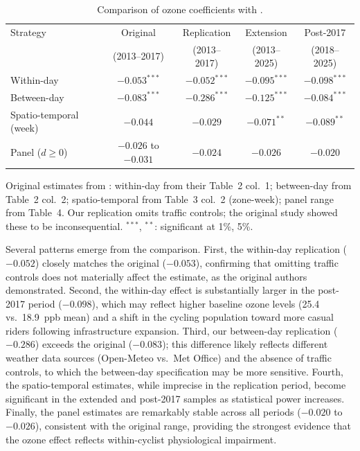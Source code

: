 \documentclass[12pt]{article}
\begin{document}
\begin{table}[H]
\centering
\caption{Comparison of ozone coefficients with \citet{klingen2020urban}.}
\label{tab:comparison}
\begin{tabular}{lcccc}
\toprule
Strategy & Original & Replication & Extension & Post-2017 \\
         & (2013--2017) & (2013--2017) & (2013--2025) & (2018--2025) \\
\midrule
Within-day        & $-0.053^{***}$ & $-0.052^{***}$ & $-0.095^{***}$ & $-0.098^{***}$ \\
Between-day       & $-0.083^{***}$ & $-0.286^{***}$ & $-0.125^{***}$ & $-0.084^{***}$ \\
Spatio-temporal (week) & $-0.044$  & $-0.029$       & $-0.071^{**}$  & $-0.089^{**}$  \\
Panel ($d \geq 0$) & $-0.026$ to $-0.031$ & $-0.024$ & $-0.026$ & $-0.020$ \\
\bottomrule
\end{tabular}

\medskip
\footnotesize Original estimates from \citet{klingen2020urban}: within-day from their Table~2 col.~1; between-day from Table~2 col.~2; spatio-temporal from Table~3 col.~2 (zone-week); panel range from Table~4. Our replication omits traffic controls; the original study showed these to be inconsequential. $^{***}$, $^{**}$: significant at 1\%, 5\%.
\end{table}

Several patterns emerge from the comparison. First, the within-day replication ($-0.052$) closely matches the original ($-0.053$), confirming that omitting traffic controls does not materially affect the estimate, as the original authors demonstrated. Second, the within-day effect is substantially larger in the post-2017 period ($-0.098$), which may reflect higher baseline ozone levels (25.4 vs.\ 18.9~ppb mean) and a shift in the cycling population toward more casual riders following infrastructure expansion. Third, our between-day replication ($-0.286$) exceeds the original ($-0.083$); this difference likely reflects different weather data sources (Open-Meteo vs.\ Met Office) and the absence of traffic controls, to which the between-day specification may be more sensitive. Fourth, the spatio-temporal estimates, while imprecise in the replication period, become significant in the extended and post-2017 samples as statistical power increases. Finally, the panel estimates are remarkably stable across all periods ($-0.020$ to $-0.026$), consistent with the original range, providing the strongest evidence that the ozone effect reflects within-cyclist physiological impairment.
\end{document}
